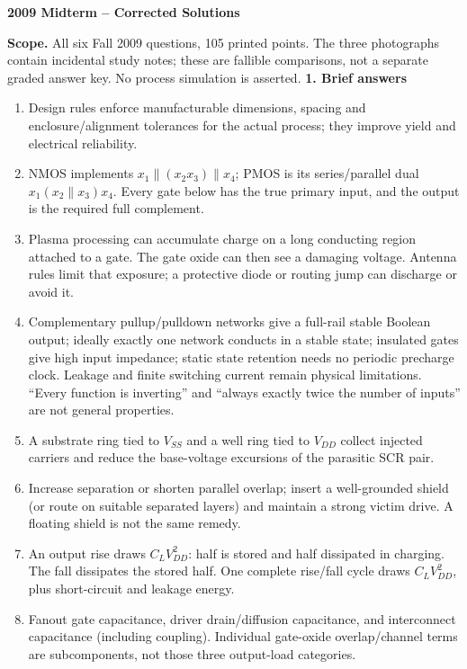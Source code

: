\documentclass[10pt]{article}
\begin{document}
\begin{center}{\Large\bfseries 2009 Midterm -- Corrected Solutions}\end{center}
\textbf{Scope.} All six Fall 2009 questions, 105 printed points. The three photographs contain incidental study notes; these are fallible comparisons, not a separate graded answer key. No process simulation is asserted.
\textbf{1. Brief answers}
\begin{enumerate}[label=(\alph*),leftmargin=7mm]
\item Design rules enforce manufacturable dimensions, spacing and enclosure/alignment tolerances for the actual process; they improve yield and electrical reliability.
\item NMOS implements $x_1\parallel(x_2x_3)\parallel x_4$; PMOS is its series/parallel dual $x_1(x_2\parallel x_3)x_4$. Every gate below has the true primary input, and the output is the required full complement.
\item Plasma processing can accumulate charge on a long conducting region attached to a gate. The gate oxide can then see a damaging voltage. Antenna rules limit that exposure; a protective diode or routing jump can discharge or avoid it.
\item Complementary pullup/pulldown networks give a full-rail stable Boolean output; ideally exactly one network conducts in a stable state; insulated gates give high input impedance; static state retention needs no periodic precharge clock. Leakage and finite switching current remain physical limitations. ``Every function is inverting'' and ``always exactly twice the number of inputs'' are not general properties.
\item A substrate ring tied to $V_{SS}$ and a well ring tied to $V_{DD}$ collect injected carriers and reduce the base-voltage excursions of the parasitic SCR pair.
\item Increase separation or shorten parallel overlap; insert a well-grounded shield (or route on suitable separated layers) and maintain a strong victim drive. A floating shield is not the same remedy.
\item An output rise draws $C_LV_{DD}^2$: half is stored and half dissipated in charging. The fall dissipates the stored half. One complete rise/fall cycle draws $C_LV_{DD}^2$, plus short-circuit and leakage energy.
\item Fanout gate capacitance, driver drain/diffusion capacitance, and interconnect capacitance (including coupling). Individual gate-oxide overlap/channel terms are subcomponents, not those three output-load categories.
\end{enumerate}
\end{document}
